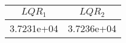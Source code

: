 \begin{tiny}\begin{tabular}{|c|c|}
\hline
\textbf{$LQR_1$}&\textbf{$LQR_2$}\\\hline
3.7231e+04&3.7236e+04\\\hline
\end{tabular}
\end{tiny}